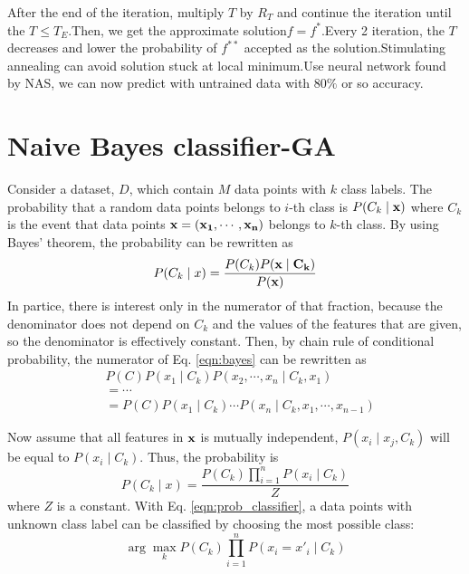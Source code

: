 \documentclass[twocolumn,10pt]{article}
\begin{document}
  After the end of the iteration, multiply $T$ by $R_T$ and continue the iteration until the $T \le T_E$.Then, we get the approximate 
  solution$f=f^*$.Every 2 iteration, the $T$ decreases and lower the probability of $f^{**}$ accepted as the solution.Stimulating annealing 
  can avoid solution stuck at local minimum.Use neural network found by NAS, we can now predict with untrained data with $80\%$ or so accuracy.

\section{Naive Bayes classifier-GA}
  Consider a dataset, $D$, which contain $M$ data points with $k$ class labels. The probability that a random data points belongs to 
  $i$-th class is $P(C_k\mid \bf{x})$ where $C_k$ is the event that data points $\bf{x}=(x_1,\cdots,x_n)$ belongs to $k$-th class.
  By using Bayes' theorem, the probability can be rewritten as 
  \begin{equation}
    \label{eqn:bayes}
    P(C_k\mid x)=\frac{P(C_k)P(\bf{x}\mid C_k)}{P(\bf{x})}
  \end{equation}
  In partice, 
  there is interest only in the numerator of that fraction, because the denominator does not depend on $C_k$ and the values of the 
  features that are given, so the denominator is effectively constant. 
  Then, by chain rule of conditional probability, the numerator of Eq. \ref{eqn:bayes} can be rewritten as
  \begin{equation}
    \label{eqn:rebayes}
    \begin{split}
      &P(C)P(x_1\mid C_k)P(x_2,\cdots,x_n\mid C_k,x_1)
      \\&=\cdots
      \\&=P(C)P(x_1\mid C_k)\cdots P(x_n\mid C_k,x_1,\cdots,x_{n-1})
    \end{split}
  \end{equation}

  Now assume that all features in $\bf{x}$ is mutually independent, $P(x_i\mid x_j, C_k)$ will be equal to $P(x_i\mid C_k)$. 
  Thus, the probability is 
  \begin{equation}
    \label{eqn:prob_classifier}
    P(C_k\mid x)=\frac{P(C_k)\prod^n_{i=1}P(x_i\mid C_k)}{Z}
  \end{equation}
  where $Z$ is a constant. 
  With Eq. \ref{eqn:prob_classifier}, a data points with unknown class label can be classified by choosing the most possible class: 
  \begin{equation}
    \label{eqn:classifier}
    \arg\max_k P(C_k)\prod^n_{i=1}P(x_i=x'_i\mid C_k)
  \end{equation}
\end{document}
